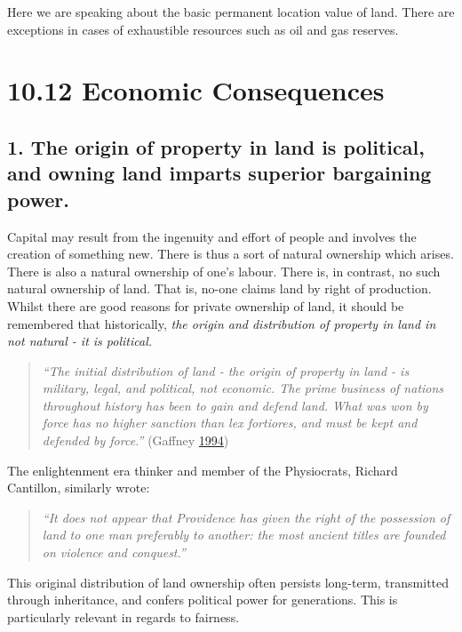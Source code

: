 \documentclass[]{tufte-handout}
\begin{document}
Here we are speaking about the basic permanent location value of land.
There are exceptions in cases of exhaustible resources such as oil and
gas reserves.

\hypertarget{economic-consequences}{%
\section{10.12 Economic Consequences}\label{economic-consequences}}

\hypertarget{the-origin-of-property-in-land-is-political-and-owning-land-imparts-superior-bargaining-power.}{%
\subsection{1. The origin of property in land is political, and owning
land imparts superior bargaining
power.}\label{the-origin-of-property-in-land-is-political-and-owning-land-imparts-superior-bargaining-power.}}

Capital may result from the ingenuity and effort of people and involves
the creation of something new. There is thus a sort of natural ownership
which arises. There is also a natural ownership of one's labour. There
is, in contrast, no such natural ownership of land. That is, no-one
claims land by right of production. Whilst there are good reasons for
private ownership of land, it should be remembered that historically,
\emph{the origin and distribution of property in land in not natural -
it is political.}

\begin{quote}
\emph{``The initial distribution of land - the origin of property in
land - is military, legal, and political, not economic. The prime
business of nations throughout history has been to gain and defend land.
What was won by force has no higher sanction than lex fortiores, and
must be kept and defended by force.''} (Gaffney
\protect\hyperlink{ref-Gaffney1994}{1994})
\end{quote}

The enlightenment era thinker and member of the Physiocrats, Richard
Cantillon, similarly wrote:

\begin{quote}
\emph{``It does not appear that Providence has given the right of the
possession of land to one man preferably to another: the most ancient
titles are founded on violence and conquest.''}
\end{quote}

This original distribution of land ownership often persists long-term,
transmitted through inheritance, and confers political power for
generations. This is particularly relevant in regards to fairness.
\end{document}
